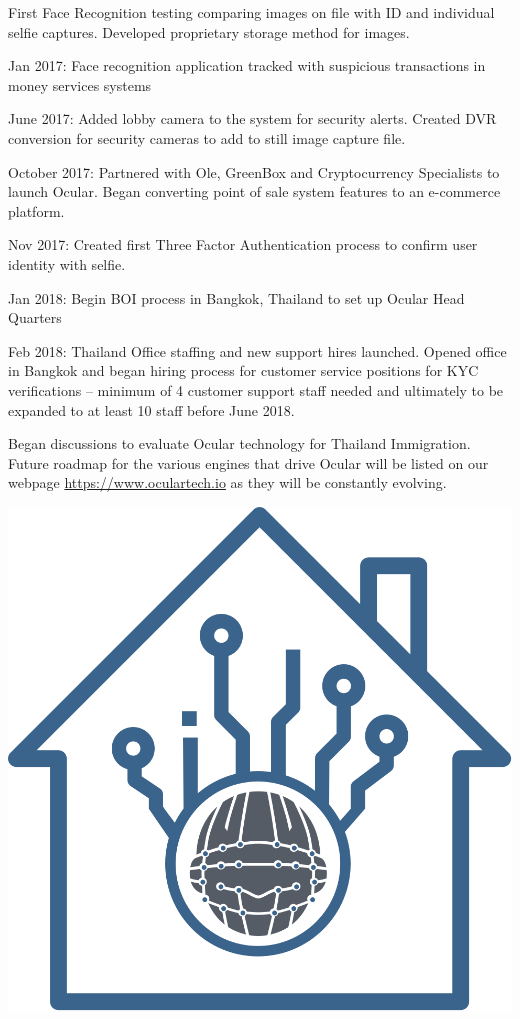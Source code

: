 \documentclass[a4paper]{article}
\let\tempone\itemize
\let\temptwo\enditemize
\renewenvironment{itemize}{\tempone\addtolength{\itemsep}{-5pt}}{\temptwo}
\begin{document}
\begin{itemize}
\item First Face Recognition testing comparing images on file with ID and individual selfie captures. Developed proprietary storage method for images.
\item Jan 2017: Face recognition application tracked with suspicious transactions in money services systems
\item June 2017: Added lobby camera to the system for security alerts. Created DVR conversion for security cameras to add to still image capture file.
\item October 2017: Partnered with Ole, GreenBox and Cryptocurrency Specialists to launch Ocular. Began converting point of sale system features to an e-commerce platform.
\item Nov 2017: Created first Three Factor Authentication process to confirm user identity with selfie.
\item Jan 2018: Begin BOI process in Bangkok, Thailand to set up Ocular Head Quarters
\item Feb 2018: Thailand Office staffing and new support hires launched. Opened office in Bangkok and began hiring process for customer service positions for KYC verifications – minimum of 4 customer support staff needed and ultimately to be expanded to at least 10 staff before June 2018.
\item Began discussions to evaluate Ocular technology for Thailand Immigration.
 \end{itemize}
Future roadmap for the various engines that drive Ocular will be listed on our webpage \url{https://www.oculartech.io} as they will be constantly evolving.
\newpage
\centerline{\includegraphics[width=1.0\textwidth]{ocular-realestate}}
\end{document}
